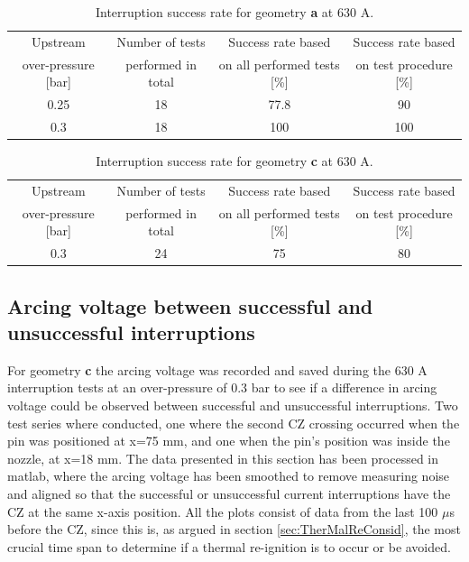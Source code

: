 \documentclass[10pt,b5paper,twoside]{article}
\begin{document}
\begin{table}[H]
\center
\caption{Interruption success rate for geometry \textbf{a} at 630 A.}
\begin{tabular}{|c|c|c|c|}
\hline 
Upstream & Number of tests & Success rate based & Success rate based \\ over-pressure [bar] &  performed in total &  on all performed tests [\%] &  on test procedure [\%] \\ 
\hline 
0.25 & 18 & 77.8 & 90 \\ 
\hline 
0.3 & 18 & 100 & 100 \\ 
\hline 
\end{tabular} 
\label{tab:successrate1}
\end{table}

\begin{table}[H]
\center
\caption{Interruption success rate for geometry \textbf{c} at 630 A.}
\begin{tabular}{|c|c|c|c|}
\hline 
Upstream & Number of tests & Success rate based & Success rate based \\ over-pressure [bar] &  performed in total &  on all performed tests [\%] &  on test procedure [\%] \\ 
\hline 
0.3 & 24 & 75 & 80 \\ 
\hline  
\end{tabular} 
\label{tab:successrate2}
\end{table}


\newpage
\subsection{Arcing voltage between successful and unsuccessful interruptions} \label{sec:arcingVoltageSuccessFulandUnsuccessfulResults}
For geometry \textbf{c} the arcing voltage was recorded and saved during the 630 A interruption tests at an over-pressure of 0.3 bar to see if a difference in arcing voltage could be observed between successful and unsuccessful interruptions. Two test series where conducted, one where the second CZ crossing occurred when the pin was positioned at x=75 mm, and one when the pin's position was inside the nozzle, at x=18 mm. The data presented in this section has been processed in matlab, where the arcing voltage has been smoothed to remove measuring noise and aligned so that the successful or unsuccessful current interruptions have the CZ at the same x-axis position. All the plots consist of data from the last 100 $\mu$s before the CZ, since this is, as argued in section \ref{sec:TherMalReConsid}, the most crucial time span to determine if a thermal re-ignition is to occur or be avoided.
\end{document}
